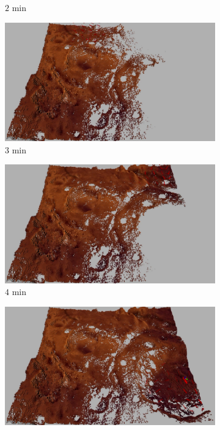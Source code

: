 \documentclass[conf]{new-aiaa}
\begin{document}
\begin{figure}[!t]
\begin{subfigure}[t]{0.49\columnwidth}
        		\caption{$2$ min}
		\vspace*{0.025\textwidth}
    	\end{subfigure}
    	\begin{subfigure}[t]{0.49\columnwidth}
           	\centering
          	\includegraphics[height=0.5\textwidth]{FullMarsMap3min.jpg}
        		\caption{$3$ min}
		\vspace*{0.025\textwidth}
    	\end{subfigure}
	\centering
	\begin{subfigure}[t]{0.49\columnwidth}
           	\centering
          	\includegraphics[height=0.5\textwidth]{FullMarsMap4min.jpg}
        		\caption{$4$ min}
		\vspace*{0.025\textwidth}
    	\end{subfigure}
    	\begin{subfigure}[t]{0.49\columnwidth}
           	\centering
          	\includegraphics[height=0.5\textwidth]{FullMarsMap5min.jpg}

\end{subfigure}
\end{figure}
\end{document}
